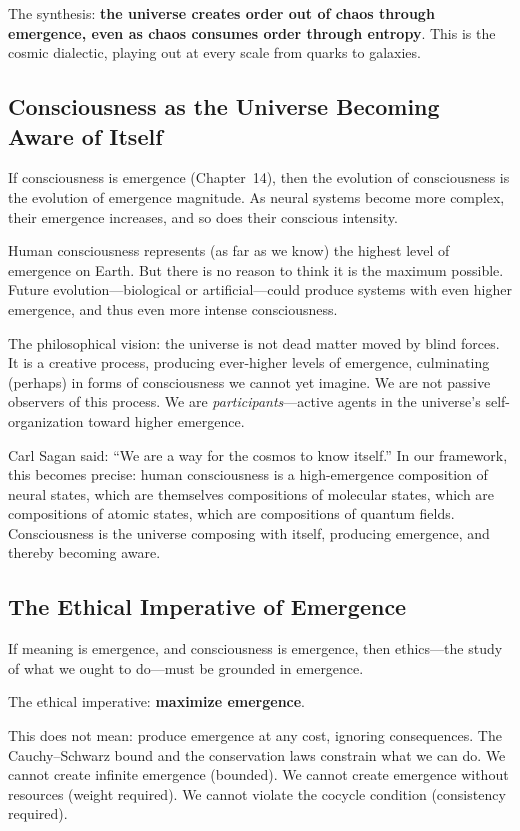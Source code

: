 The synthesis: \textbf{the universe creates order out of chaos through
emergence, even as chaos consumes order through entropy}. This is the cosmic
dialectic, playing out at every scale from quarks to galaxies.

\subsection{Consciousness as the Universe Becoming Aware of Itself}

If consciousness is emergence (Chapter~14), then the evolution of consciousness
is the evolution of emergence magnitude. As neural systems become more complex,
their emergence increases, and so does their conscious intensity.

Human consciousness represents (as far as we know) the highest level of
emergence on Earth. But there is no reason to think it is the maximum possible.
Future evolution---biological or artificial---could produce systems with even
higher emergence, and thus even more intense consciousness.

The philosophical vision: the universe is not dead matter moved by blind
forces. It is a creative process, producing ever-higher levels of emergence,
culminating (perhaps) in forms of consciousness we cannot yet imagine. We are
not passive observers of this process. We are \emph{participants}---active
agents in the universe's self-organization toward higher emergence.

Carl Sagan said: ``We are a way for the cosmos to know itself.'' In our
framework, this becomes precise: human consciousness is a high-emergence
composition of neural states, which are themselves compositions of molecular
states, which are compositions of atomic states, which are compositions of
quantum fields. Consciousness is the universe composing with itself, producing
emergence, and thereby becoming aware.

\subsection{The Ethical Imperative of Emergence}

If meaning is emergence, and consciousness is emergence, then ethics---the
study of what we ought to do---must be grounded in emergence.

The ethical imperative: \textbf{maximize emergence}.

This does not mean: produce emergence at any cost, ignoring consequences. The
Cauchy--Schwarz bound and the conservation laws constrain what we can do. We
cannot create infinite emergence (bounded). We cannot create emergence without
resources (weight required). We cannot violate the cocycle condition (consistency
required).

